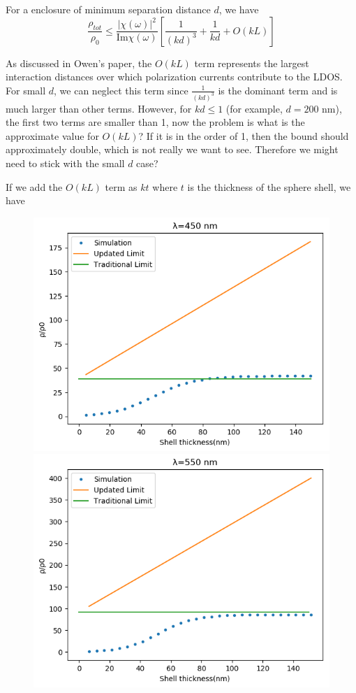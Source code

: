 \documentclass[12pt]{article}
\begin{document}
For a enclosure of minimum separation distance $d$, we have
\begin{equation}
\frac{\rho_{tot}}{\rho_0} \leq \frac{|\chi(\omega)|^2}{\mathrm{Im}\chi(\omega)}[\frac{1}{(kd)^3}+\frac{1}{kd}+O(kL)]
\end{equation}

As discussed in Owen's paper, the $O(kL)$ term represents the largest interaction distances over which polarization currents contribute to the LDOS. For small $d$, we can neglect this term since $\frac{1}{(kd)^3}$ is the dominant term and is much larger than other terms. However, for $kd\leq 1$ (for example, $d=200$ nm), the first two terms are smaller than 1, now the problem is what is the approximate value for $O(kL)$? If it is in the order of 1, then the bound should approximately double, which is not really we want to see. Therefore we might need to stick with the small $d$ case?

If we add the $O(kL)$ term as $kt$ where $t$ is the thickness of the sphere shell, we have
\begin{figure}[H]
\centering
\includegraphics[width=0.45\linewidth]{450limit.png}
\includegraphics[width=0.45\linewidth]{550limit.png}
\end{figure}
\end{document}
